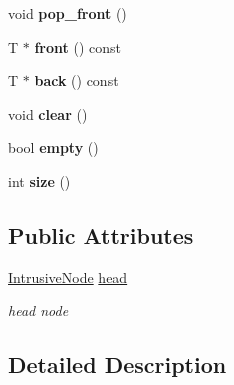 \begin{DoxyCompactItemize}
\item 
\hypertarget{classIntrusiveList_a179fb596c43dbfaed05c29ec00742684}{}void {\bfseries pop\+\_\+front} ()\label{classIntrusiveList_a179fb596c43dbfaed05c29ec00742684}

\item 
\hypertarget{classIntrusiveList_a8e350ac902999c48924654de8875b2fa}{}T $\ast$ {\bfseries front} () const \label{classIntrusiveList_a8e350ac902999c48924654de8875b2fa}

\item 
\hypertarget{classIntrusiveList_aa2156fd9367a6db106fc7ac081bece7b}{}T $\ast$ {\bfseries back} () const \label{classIntrusiveList_aa2156fd9367a6db106fc7ac081bece7b}

\item 
\hypertarget{classIntrusiveList_a7a2d8a89faa7a5b92c783d1cf373a346}{}void {\bfseries clear} ()\label{classIntrusiveList_a7a2d8a89faa7a5b92c783d1cf373a346}

\item 
\hypertarget{classIntrusiveList_af3f0bf57760bb4ca7c15fd4f2e93f731}{}bool {\bfseries empty} ()\label{classIntrusiveList_af3f0bf57760bb4ca7c15fd4f2e93f731}

\item 
\hypertarget{classIntrusiveList_aaf2c0152fd8d0e24cd302099eddb19ca}{}int {\bfseries size} ()\label{classIntrusiveList_aaf2c0152fd8d0e24cd302099eddb19ca}

\end{DoxyCompactItemize}
\subsection*{Public Attributes}
\begin{DoxyCompactItemize}
\item 
\hypertarget{classIntrusiveList_a6c65e0b9c6c08b0cd94dd470602f8b7b}{}\hyperlink{structIntrusiveNode}{Intrusive\+Node} \hyperlink{classIntrusiveList_a6c65e0b9c6c08b0cd94dd470602f8b7b}{head}\label{classIntrusiveList_a6c65e0b9c6c08b0cd94dd470602f8b7b}

\begin{DoxyCompactList}\small\item\em head node \end{DoxyCompactList}\end{DoxyCompactItemize}


\subsection{Detailed Description}
